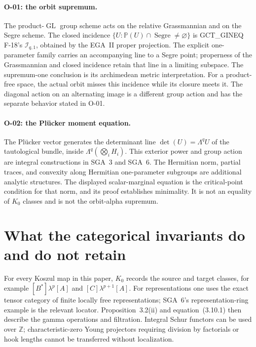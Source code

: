 \paragraph{O-01: the orbit supremum.}
The product-$\operatorname{GL}$ group scheme acts on
the relative Grassmannian and on the Segre scheme.
The closed incidence
$\{U:\mathbb P(U)\cap\operatorname{Segre}\ne\varnothing\}$
is GCT\_GINEQ F-18's $\mathcal I_{q,1}$, obtained by
the EGA~II proper projection. The explicit
one-parameter family carries an accompanying line
to a Segre point; properness of the Grassmannian
and closed incidence retain that line in a limiting
subspace. The supremum-one conclusion is its
archimedean metric interpretation. For a product-free
space, the actual orbit misses this incidence while
its closure meets it. The diagonal action on an
alternating image is a different group action and
has the separate behavior stated in O-01.

\paragraph{O-02: the Pl\"ucker moment equation.}
The Pl\"ucker vector generates the determinant line
$\det(U)=\Lambda^q U$ of the tautological bundle,
inside $\Lambda^q(\bigotimes_i H_i)$. This exterior
power and group action are integral constructions
in SGA~3 and SGA~6. The Hermitian norm, partial
traces, and convexity along Hermitian one-parameter
subgroups are additional analytic structures.
The displayed scalar-marginal equation is the
critical-point condition for that norm, and its
proof establishes minimality. It is not an equality
of $K_0$ classes and is not the orbit-alpha supremum.

\section{What the categorical invariants do and do not retain}

For every Koszul map in this paper, $K_0$ records
the source and target classes, for example
$[B^*]\lambda^p[A]$ and $[C]\lambda^{p+1}[A]$.
For representations one uses the exact tensor
category of finite locally free representations;
SGA~6's representation-ring example is the relevant
locator. Proposition~3.2(ii) and equation~(3.10.1)
then describe the gamma operations and filtration.
Integral Schur functors can be used over
$\mathbb Z$; characteristic-zero Young projectors
requiring division by factorials or hook lengths
cannot be transferred without localization.

